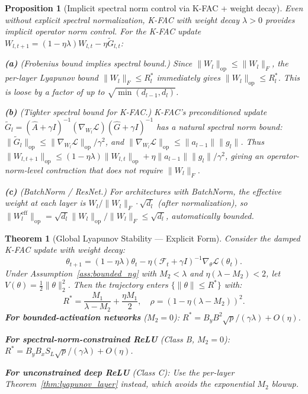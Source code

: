 \documentclass{article}
\providecommand{\FIM}{\mathcal{F}}
\providecommand{\norm}[1]{\lVert #1 \rVert}
\theoremstyle{plain}
\newtheorem{theorem}{Theorem}
\newtheorem{proposition}{Proposition}
\theoremstyle{definition}
\theoremstyle{remark}
\begin{document}
\begin{proposition}[Implicit spectral norm control via K-FAC + weight decay]
\label{prop:implicit_spectral}
Even without explicit spectral normalization, K-FAC with weight decay $\lambda > 0$ provides implicit operator norm control. For the K-FAC update $W_{l,t+1} = (1-\eta\lambda)W_{l,t} - \eta\tilde{G}_{l,t}$:

\textbf{(a)} \emph{(Frobenius bound implies spectral bound.)} Since $\norm{W_l}_{\mathrm{op}} \leq \norm{W_l}_F$, the per-layer Lyapunov bound $\norm{W_l}_F \leq R_l^*$ immediately gives $\norm{W_l}_{\mathrm{op}} \leq R_l^*$. This is loose by a factor of up to $\sqrt{\min(d_{l-1}, d_l)}$.

\textbf{(b)} \emph{(Tighter spectral bound for K-FAC.)} K-FAC's preconditioned update $\tilde{G}_l = (\hat{A} + \gamma I)^{-1}(\nabla_{W_l}\mathcal{L})(\hat{G} + \gamma I)^{-1}$ has a natural spectral norm bound: $\norm{\tilde{G}_l}_{\mathrm{op}} \leq \norm{\nabla_{W_l}\mathcal{L}}_{\mathrm{op}}/\gamma^2$, and $\norm{\nabla_{W_l}\mathcal{L}}_{\mathrm{op}} \leq \norm{a_{l-1}}\norm{g_l}$. Thus $\norm{W_{l,t+1}}_{\mathrm{op}} \leq (1-\eta\lambda)\norm{W_{l,t}}_{\mathrm{op}} + \eta\norm{a_{l-1}}\norm{g_l}/\gamma^2$, giving an \emph{operator-norm-level} contraction that does not require $\norm{W_l}_F$.

\textbf{(c)} \emph{(BatchNorm / ResNet.)} For architectures with BatchNorm, the effective weight at each layer is $W_l / \norm{W_l}_F \cdot \sqrt{d_l}$ (after normalization), so $\norm{W_l^{\mathrm{eff}}}_{\mathrm{op}} = \sqrt{d_l}\norm{W_l}_{\mathrm{op}}/\norm{W_l}_F \leq \sqrt{d_l}$, automatically bounded.
\end{proposition}

\begin{theorem}[Global Lyapunov Stability --- Explicit Form]
\label{thm:lyapunov}
Consider the damped K-FAC update with weight decay:
\begin{equation}
\label{eq:ngd_wd}
    \theta_{t+1} = (1 - \eta\lambda)\theta_t - \eta (\FIM_t + \gamma I)^{-1}\nabla_\theta \mathcal{L}(\theta_t).
\end{equation}
Under Assumption~\ref{ass:bounded_ng} with $M_2 < \lambda$ and $\eta(\lambda - M_2) < 2$, let $V(\theta) = \frac{1}{2}\norm{\theta}_2^2$. Then the trajectory enters $\{\norm{\theta} \leq R^*\}$ with:
\begin{equation}
    R^* = \frac{M_1}{\lambda - M_2} + \frac{\eta M_1}{2}, \quad \rho = (1 - \eta(\lambda\!-\!M_2))^2.
\end{equation}
\textbf{For bounded-activation networks} ($M_2 = 0$): $R^* = B_y B^2\sqrt{p}/(\gamma\lambda) + O(\eta)$.

\textbf{For spectral-norm-constrained ReLU} (Class B, $M_2 = 0$): $R^* = B_y B_x S_L\sqrt{p}/(\gamma\lambda) + O(\eta)$.

\textbf{For unconstrained deep ReLU} (Class C): Use the per-layer Theorem~\ref{thm:lyapunov_layer} instead, which avoids the exponential $M_2$ blowup.
\end{theorem}
\end{document}
